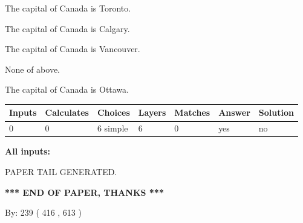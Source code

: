 \documentclass[12pt]{article}
\begin{document}
 
The capital of Canada is Toronto.
 
 
The capital of Canada is Calgary.
 
 
The capital of Canada is Vancouver.
 
 
 None of above.
 
 
\noindent{}
 
 
The capital of Canada is Ottawa.
 
 
\noindent{}
 
 
   
   
   
   
\noindent\begin{tabular}{|l|l|l|l|l|l|l|}
 \hline
Inputs & Calculates & Choices & Layers & Matches & Answer & Solution \\ \hline
 0  & 
 0  & 
 6
  simple  
  & 
 6  & 
 0  & 
  yes & 
  no 
  \\ \hline
 \end{tabular}
   
   
   
   
\noindent{}
   
   
   
   
\noindent\vspace{0.1in}\hspace{-0.08in} {\textbf{\Large{All inputs: }}}
   
   
   
   
   
   
 \vspace{0.2in}
 
   
   
\vspace{2.0in} PAPER TAIL GENERATED.
   
   
   
   
\vspace{1.0in} 
{\textbf{\large{ *** END OF PAPER, THANKS *** }}} 
   
   
\hspace{1.0in} By: 
 239 ( 416 ,  613 )
   
   
   
   
\newpage 
\setcounter{page}{ 
   495001 } 
   
\end{document}
